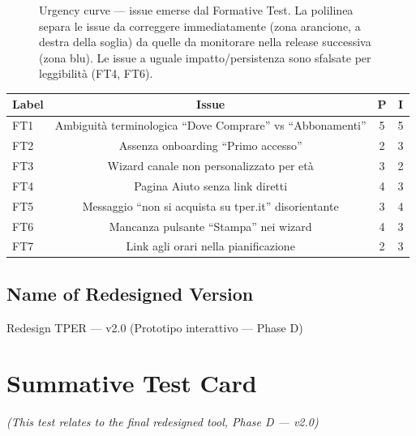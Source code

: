 ﻿\documentclass[11pt,a4paper]{article}
\begin{document}
\begin{figure}[H]
\caption{Urgency curve --- issue emerse dal Formative Test. La polilinea
  separa le issue da correggere immediatamente (zona arancione, a destra
  della soglia) da quelle da monitorare nella release successiva (zona
  blu). Le issue a uguale impatto/persistenza sono sfalsate per
  leggibilità (FT4, FT6).}
\label{fig:urgency-curve-ft}
\end{figure}

\vspace{0.3cm}

\noindent\begin{tabular}{lccc}
\toprule
\textbf{Label} & \textbf{Issue} & \textbf{P} & \textbf{I} \\
\midrule
FT1 & Ambiguità terminologica ``Dove Comprare'' vs ``Abbonamenti'' & 5 & 5 \\
FT2 & Assenza onboarding ``Primo accesso'' & 2 & 3 \\
FT3 & Wizard canale non personalizzato per età & 3 & 2 \\
FT4 & Pagina Aiuto senza link diretti & 4 & 3 \\
FT5 & Messaggio ``non si acquista su tper.it'' disorientante & 3 & 4 \\
FT6 & Mancanza pulsante ``Stampa'' nei wizard & 4 & 3 \\
FT7 & Link agli orari nella pianificazione & 2 & 3 \\
\bottomrule
\end{tabular}

\vspace{0.2cm}

\subsection*{Name of Redesigned Version}
\begin{tcolorbox}[base]
Redesign TPER --- v2.0 (Prototipo interattivo --- Phase D)
\end{tcolorbox}


\newpage

\section{Summative Test Card}
\textit{(This test relates to the final redesigned tool, Phase D --- v2.0)}
\end{document}
